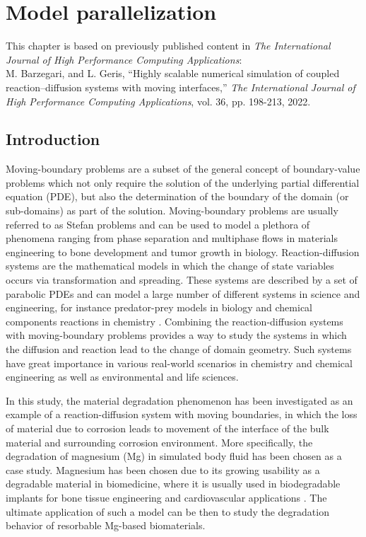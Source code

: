 \chapter{Model parallelization}\label{ch:hpc}


\begin{shaded}
This chapter is based on previously published content in \textit{The International Journal of High Performance Computing Applications}:\\
M. Barzegari, and L. Geris, ``Highly scalable numerical simulation of coupled reaction–diffusion systems with moving interfaces,'' \textit{The International Journal of High Performance Computing Applications}, vol. 36, pp. 198-213, 2022.
\end{shaded}

\section{Introduction}

Moving-boundary problems \cite{Crank1987} are a subset of the general concept of boundary-value problems which not only require the solution of the underlying partial differential equation (\gls{PDE}), but also the determination of the boundary of the domain (or sub-domains) as part of the solution.  Moving-boundary problems are usually referred to as Stefan problems \cite{Crank1987} and can be used to model a plethora of phenomena ranging from phase separation and multiphase flows in materials engineering to bone development and tumor growth in biology. Reaction-diffusion systems are the  mathematical models in which the change of state variables occurs via transformation and spreading. These systems are described by a set of parabolic \gls{PDE}s and can model a large number of different systems in science and engineering, for instance predator-prey models in biology and chemical components reactions in chemistry \cite{Grindrod1996}. Combining the reaction-diffusion systems with moving-boundary problems provides a way to study the systems in which the diffusion and reaction lead to the change of domain geometry. Such systems have great importance in various real-world scenarios in chemistry and chemical engineering as well as environmental and life sciences.


In this study, the material degradation phenomenon has been investigated as an example of a reaction-diffusion system with moving boundaries, in which the loss of material due to corrosion leads to movement of the interface of the bulk material and surrounding corrosion environment. More specifically, the degradation of magnesium (Mg) in simulated body fluid has been chosen as a case study. Magnesium has been chosen due to its growing usability as a degradable material in biomedicine, where it is usually used in  biodegradable implants for bone tissue engineering and cardiovascular applications \cite{Chen2014,Zhao2017}. The ultimate application of such a model can be then to study the degradation behavior of resorbable Mg-based biomaterials.

